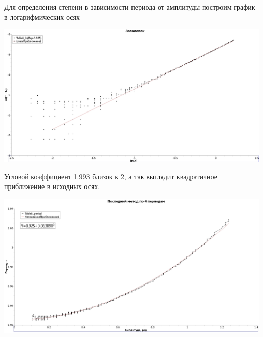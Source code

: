 \documentclass[12pt,a4paper]{scrartcl}
\begin{document}
Для определения степени в зависимости периода от амплитуды построим график в логарифмических осях
\begin{flushleft}
\includegraphics[scale=0.45]{Ln}
\end{flushleft}
Угловой коэффициент 1.993 близок к 2, а так выглядит квадратичное приближение в исходных осях.
\begin{flushleft}
\includegraphics[scale=0.45]{T(A)}
\end{flushleft}
\end{document}
